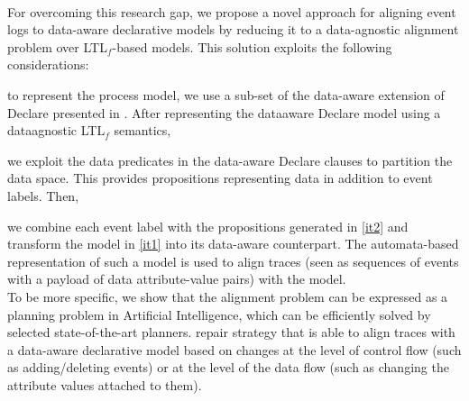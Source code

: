 \\
\indent
For overcoming this research gap, we propose a novel approach for aligning event logs to data-aware declarative models by reducing it to a data-agnostic alignment problem over LTL$_f$-based models. This solution exploits the following considerations: \begin{enumerate*}[label=\emph{\alph*})]
	\item \label{it1} to represent the process model, we use a sub-set of the data-aware extension of Declare presented in \cite{BurattinMS16}. After representing the data\-aware Declare model using a data\added{-}agnostic LTL$_f$ semantics,
	\item \label{it2} we exploit the data predicates in the data-aware Declare clauses to partition the data space. This provides propositions representing data in addition to event labels. Then,
	\item we combine each event label with the propositions generated in \ref{it2} and transform the model in \ref{it1} into its data-aware counterpart. The automata-based representation of such a model is used to align traces (seen as sequences of events with a payload of data attribute-value pairs) with the model.
%
%
%
%
\\
\indent To be more specific, we show that the alignment problem can be expressed as a planning problem in Artificial Intelligence, which can be efficiently solved by selected state-of-the-art planners.
%
%
%
 repair strategy that is able to align traces with a data-aware declarative model based on changes at the level of control flow (such as adding/deleting events) or at the level of the data flow (such as changing the attribute values attached to them).
\end{enumerate*}

